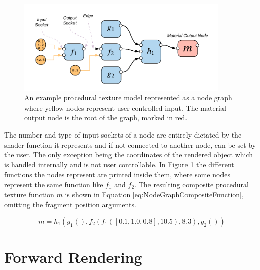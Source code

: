 \begin{figure}[h]
    \centering
    \includegraphics[width=0.9\textwidth]{img/method/Node Graph.pdf}
    \caption{An example procedural texture model represented as a node graph where yellow nodes represent user controlled input. The material output node is the root of the graph, marked in red.}
    \label{fig:NodeGraph}
\end{figure}

The number and type of input sockets of a node are entirely dictated by the shader function it represents and if not connected to another node, can be set by the user. The only exception being the coordinates of the rendered object which is handled internally and is not user controllable. In Figure \ref{fig:NodeGraph} the different functions the nodes represent are printed inside them, where some nodes represent the same function like $f_1$ and $f_2$. The resulting composite procedural texture function $m$ is shown in Equation \ref{eq:NodeGraphCompositeFunction}, omitting the fragment position arguments.

\begin{equation}
    m = h_1(g_1(), f_2(f_1(\left[0.1, 1.0, 0.8\right], 10.5), 8.3), g_2())
    \label{eq:NodeGraphCompositeFunction}
\end{equation}



\section{Forward Rendering}\label{sec:RenderingInOpenGL}

